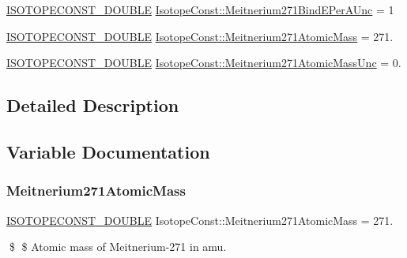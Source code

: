 \begin{DoxyCompactItemize}
\mbox{\hyperlink{group___isotope_const-_macros_ga8f45a7272ce02c0b4c65c44636ed719a}{I\+S\+O\+T\+O\+P\+E\+C\+O\+N\+S\+T\+\_\+\+D\+O\+U\+B\+LE}} \mbox{\hyperlink{group___isotope_const-_meitnerium-_mt271_ga34de78dcb537f86196505b0a58bb9ba8}{Isotope\+Const\+::\+Meitnerium271\+Bind\+E\+Per\+A\+Unc}} = 1
\item 
\mbox{\hyperlink{group___isotope_const-_macros_ga8f45a7272ce02c0b4c65c44636ed719a}{I\+S\+O\+T\+O\+P\+E\+C\+O\+N\+S\+T\+\_\+\+D\+O\+U\+B\+LE}} \mbox{\hyperlink{group___isotope_const-_meitnerium-_mt271_ga64f33849d820ed68a7b45ed41a7071c2}{Isotope\+Const\+::\+Meitnerium271\+Atomic\+Mass}} = 271.
\item 
\mbox{\hyperlink{group___isotope_const-_macros_ga8f45a7272ce02c0b4c65c44636ed719a}{I\+S\+O\+T\+O\+P\+E\+C\+O\+N\+S\+T\+\_\+\+D\+O\+U\+B\+LE}} \mbox{\hyperlink{group___isotope_const-_meitnerium-_mt271_ga6887debbfd9b089abe0c81a1e9f30369}{Isotope\+Const\+::\+Meitnerium271\+Atomic\+Mass\+Unc}} = 0.
\end{DoxyCompactItemize}


\subsection{Detailed Description}


\subsection{Variable Documentation}
\mbox{\label{group___isotope_const-_meitnerium-_mt271_ga64f33849d820ed68a7b45ed41a7071c2}} 
\subsubsection{\texorpdfstring{Meitnerium271\+Atomic\+Mass}{Meitnerium271AtomicMass}}
{\footnotesize\ttfamily \mbox{\hyperlink{group___isotope_const-_macros_ga8f45a7272ce02c0b4c65c44636ed719a}{I\+S\+O\+T\+O\+P\+E\+C\+O\+N\+S\+T\+\_\+\+D\+O\+U\+B\+LE}} Isotope\+Const\+::\+Meitnerium271\+Atomic\+Mass = 271.}

\$ \$ Atomic mass of Meitnerium-\/271 in amu. \mbox{\label{group___isotope_const-_meitnerium-_mt271_ga6887debbfd9b089abe0c81a1e9f30369}} 
